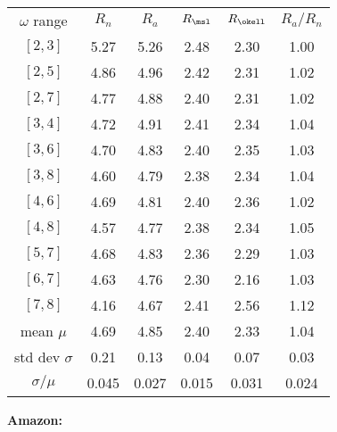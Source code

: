 \begin{frame}[label=]
\begin{frame}[label=]
\begin{frame}[label=]
\begin{frame}[label=]
\begin{frame}[label=]
\begin{frame}[label=]
\begin{frame}[label=]
\begin{frame}[label=]
\begin{frame}[label=]
\begin{frame}[label=]
\begin{frame}[label=]
\begin{frame}[label=]
\begin{frame}[label=]
\begin{frame}[label=]
  \begin{tabular}{cccccc}
    $\omega$ range & $R_n$ & $R_a$ & $R_\msl$ & $R_{\okell}$ & $R_a/R_n$ \\
    $[2,3]$ & 5.27 & 5.26 & 2.48 & 2.30 & 1.00 \\
    $[2,5]$ & 4.86 & 4.96 & 2.42 & 2.31 & 1.02 \\
    $[2,7]$ & 4.77 & 4.88 & 2.40 & 2.31 & 1.02 \\
    $[3,4]$ & 4.72 & 4.91 & 2.41 & 2.34 & 1.04 \\
    $[3,6]$ & 4.70 & 4.83 & 2.40 & 2.35 & 1.03 \\
    $[3,8]$ & 4.60 & 4.79 & 2.38 & 2.34 & 1.04 \\
    $[4,6]$ & 4.69 & 4.81 & 2.40 & 2.36 & 1.02 \\
    $[4,8]$ & 4.57 & 4.77 & 2.38 & 2.34 & 1.05 \\
    $[5,7]$ & 4.68 & 4.83 & 2.36 & 2.29 & 1.03 \\
    $[6,7]$ & 4.63 & 4.76 & 2.30 & 2.16 & 1.03 \\
    $[7,8]$ & 4.16 & 4.67 & 2.41 & 2.56 & 1.12 \\
    mean $\mu$ & 4.69 & 4.85 & 2.40 & 2.33 & 1.04 \\
    std dev $\sigma$ & 0.21 &  0.13 & 0.04 & 0.07 & 0.03 \\
    $\sigma/\mu$ & 0.045 &  0.027 & 0.015 & 0.031 & 0.024 \\
  \end{tabular}

\begin{frame}[label=]
   \textbf{Amazon:}


\end{frame}
\end{frame}
\end{frame}
\end{frame}
\end{frame}
\end{frame}
\end{frame}
\end{frame}
\end{frame}
\end{frame}
\end{frame}
\end{frame}
\end{frame}
\end{frame}
\end{frame}
